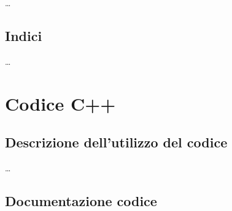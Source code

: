 \documentclass[11pt]{article}
\begin{document}
\dots

\subsection{Indici}

\dots

\section{Codice C++}

\subsection{Descrizione dell'utilizzo del codice}

\dots

\subsection{Documentazione codice}
\end{document}
